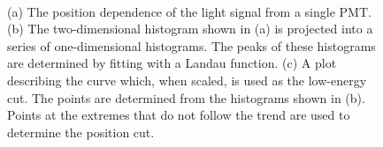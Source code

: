 \begin{figure}[!htbp]
\centering
{} \\
\hspace{8pt}
\caption[Determining the position-dependent lower-energy cut using the energy spectrum due to muons.]{(a) The position dependence of the light signal from a single PMT.  (b) The two-dimensional histogram shown in (a) is projected into a series of one-dimensional histograms.  The peaks of these histograms are determined by fitting with a Landau function.  (c) A plot describing the curve which, when scaled, is used as the low-energy cut.  The points are determined from the histograms shown in (b).  Points at the extremes that do not follow the trend are used to determine the position cut.}
\label{fig:fits_pkVSpos}
\end{figure}
